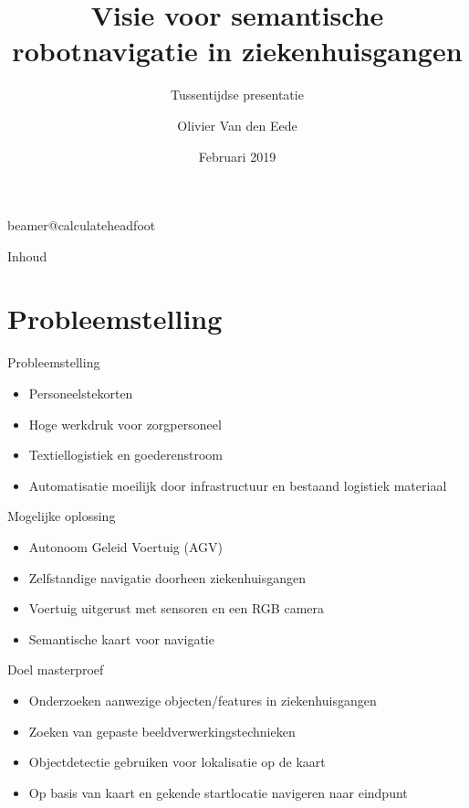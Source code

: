 \documentclass[11pt,t]{beamer}
\title[Tussentijdse presentatie]{Visie voor semantische robotnavigatie in ziekenhuisgangen} %
\subtitle{Tussentijdse presentatie}
\author{Olivier Van den Eede}
\institute{KU Leuven - De Nayer}
\date{Februari 2019}
\begin{document}
\csname beamer@calculateheadfoot\endcsname %

\begin{frame}
	\titlepage
\end{frame}
	

\begin{frame}{Inhoud}
	\hfill	{\large \parbox{.961\textwidth}{\tableofcontents[hideothersubsections]}}
\end{frame}



\section{Probleemstelling}
\begin{frame}[fragile]{Probleemstelling}
	\begin{itemize}
		\item Personeelstekorten
		\item Hoge werkdruk voor zorgpersoneel
		\item Textiellogistiek en goederenstroom
		\item Automatisatie moeilijk door infrastructuur en bestaand logistiek materiaal
	\end{itemize}
\end{frame}

\begin{frame}[fragile]{Mogelijke oplossing}
	\begin{itemize}
		\item Autonoom Geleid Voertuig (AGV)
		\item Zelfstandige navigatie doorheen ziekenhuisgangen
		\item Voertuig uitgerust met sensoren en een RGB camera
		\item Semantische kaart voor navigatie
	\end{itemize}
\end{frame}

\begin{frame}[fragile]{Doel masterproef}
	\begin{itemize}
		\item Onderzoeken aanwezige objecten/features in ziekenhuisgangen
		\item Zoeken van gepaste beeldverwerkingstechnieken
		\item Objectdetectie gebruiken voor lokalisatie op de kaart
		\item Op basis van kaart en gekende startlocatie navigeren naar eindpunt
	\end{itemize}
\end{frame}
\end{document}
